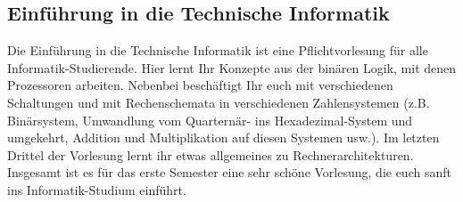 \subsection{Einführung in die Technische Informatik}
\label{info2}
Die Einführung in die Technische Informatik ist eine Pflichtvorlesung für alle Informatik-Studierende. Hier lernt Ihr Konzepte aus der binären Logik, mit denen Prozessoren arbeiten. Nebenbei beschäftigt Ihr euch mit verschiedenen Schaltungen und mit Rechenschemata in verschiedenen Zahlensystemen (z.B. Binärsystem, Umwandlung vom Quarternär- ins Hexadezimal-System und umgekehrt, Addition und Multiplikation auf diesen Systemen usw.). Im letzten Drittel der Vorlesung lernt ihr etwas allgemeines zu Rechnerarchitekturen. Insgesamt ist es für das erste Semester eine sehr schöne Vorlesung, die euch sanft ins Informatik-Studium einführt.
